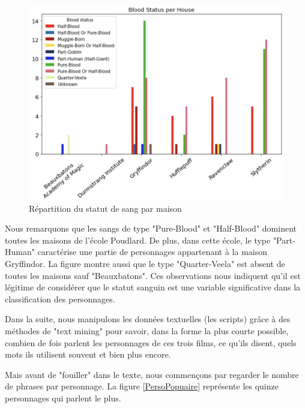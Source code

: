 \documentclass[11pt]{article}
\begin{document}
\begin{center}
\begin{figure}[hbt!]
    \centering
    \includegraphics[width= 13cm, height= 8 cm]{./figures/blood_status.png}
    \caption{Répartition du statut de sang par maison}
    \label{Sang}
\end{figure}
\FloatBarrier

Nous remarquons que les sangs de type "Pure-Blood" et "Half-Blood" dominent toutes les maisons de l'école Poudlard. De plus, dans cette école, le type "Part-Human" caractérise une partie de personnages appartenant à la maison Gryffindor. La figure montre aussi que le type "Quarter-Veela" est absent de toutes les maisons sauf "Beauxbatons". Ces observations nous indiquent qu'il est légitime de considérer que le statut sanguin est une variable significative dans la classification des personnages.\par

Dans la suite, nous manipulons les données textuelles (les scripts) grâce à des méthodes de "text mining" pour savoir, dans la forme la plus courte possible, combien de fois parlent les personnages de ces trois films, ce qu'ils disent, quels mots ils utilisent souvent et bien plus encore.\par

Mais avant de "fouiller" dans le texte, nous commençons par regarder le nombre de phrases par personnage. La figure \ref{PersoPopuaire} représente les quinze personnages qui parlent le plus.


\end{center}
\end{document}
